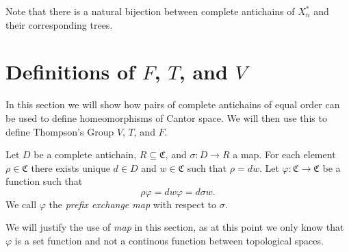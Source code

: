 \documentclass[12pt]{amsart}
\newcommand{\wh}[1]{\widehat{#1}}
\newcommand{\CS}{\mathfrak{C}}
\newcommand{\T}{\mathcal{T}}
\newcommand{\xns}{X_n^*}
\begin{document}
        Note that there is a natural bijection between complete antichains of $\xns$ and their corresponding trees.
        
        
        \begin{comment}
        \begin{definition}[Descendants]
            Let $w$ and $v$ be some vertices in $\T$. We say $v$ is a \textit{child} of $w$ if there exists some $x \in X$ such that $v=w x$. In this case we will denote $w$ to be a \textit{parent} of $v$. Also we say that all $v$ in $\T$ satisfying $w \prec v$ are \textit{descendants} of $w$, and all $y$ in $\T$ satisfying $y\prec w$ are \textit{ancestors} of $w$.
            
            Hence for any $w$, the caret $\wh{w}$ consists of $w$ and both of its children.
        \end{definition}
        \end{comment}
        
    \section{Definitions of $F$, $T$, and $V$}
    
        
        In this section we will show how pairs of complete antichains of equal order can be used to define homeomorphisms of Cantor space. We will then use this to define Thompson's Group $V$, $T$, and $F$.
        
        \begin{definition}
        
        
            Let $D$ be a complete antichain, $R \subseteq \CS$, and $\sigma: D \to R$ a map.  For each element $\rho \in \mathfrak{C}$ there exists unique $d \in D$ and $w \in \mathfrak{C}$ such that $\rho = d w$. Let $\varphi : \mathfrak{C} \to \mathfrak{C}$ be a function such that $$\rho \varphi = d  w  \varphi = d \sigma  w .$$ We call $\varphi$ the \textit{prefix exchange map} with respect to $\sigma$.
        
        \end{definition}
        
        We will justify the use of \textit{map} in this section, as at this point we only know that $\varphi$ is a set function and not a continous function between topological spaces. 
        
\end{document}
